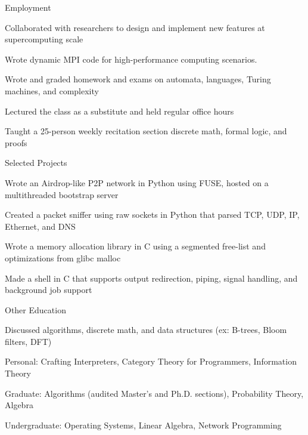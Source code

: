\documentclass{cv}
\begin{document}
\begin{cvsection}{Employment}
{    \item Collaborated with researchers to design and implement new features at supercomputing scale
    \item Wrote dynamic MPI code for high-performance computing scenarios.
  }
  {
    \item Wrote and graded homework and exams on automata, languages, Turing machines, and complexity
    \item Lectured the class as a substitute and held regular office hours
  }
  {
    \item Taught a 25-person weekly recitation section discrete math, formal logic, and proofs
  }
\end{cvsection}

\begin{cvsection}{Selected Projects}
  {
    \item Wrote an Airdrop-like P2P network in Python using FUSE, hosted on a multithreaded bootstrap server
  }
  {
    \item Created a packet sniffer using raw sockets in Python that parsed TCP, UDP, IP, Ethernet, and DNS
  }
  {
    \item Wrote a memory allocation library in C using a segmented free-list and optimizations from glibc malloc
  }
  {
    \item Made a shell in C that supports output redirection, piping, signal handling, and background job support
  }
\end{cvsection}

\begin{cvsection}{Other Education}
  {
    \item Discussed algorithms, discrete math, and data structures (ex: B-trees, Bloom filters, DFT)
  }
  {
  \item Personal: Crafting Interpreters, Category Theory for Programmers, Information Theory
  \item Graduate: Algorithms (audited Master's and Ph.D. sections), Probability Theory, Algebra
  \item Undergraduate: Operating Systems, Linear Algebra, Network Programming
  }
\end{cvsection}
\end{document}
